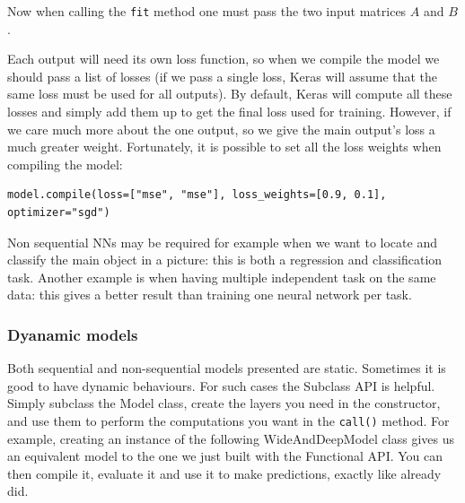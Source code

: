 Now when calling the \lstinline+fit+ method one must pass the two input matrices $A$ and $B$.

Each output will need its own loss function, so when we compile the model we should pass a list of losses (if we pass a single loss, Keras will assume that the same loss must be used for all outputs). By default, Keras will compute all these losses and simply add them up to get the final loss used for training. However, if we care much more about the one output, so we give the main output's loss a much greater weight. Fortunately, it is possible to set all the loss weights when compiling the model:
\begin{lstlisting}
model.compile(loss=["mse", "mse"], loss_weights=[0.9, 0.1], optimizer="sgd")
\end{lstlisting}
				
Non sequential NNs may be required for example when we want to locate and classify the main object in a picture: this is both a regression and classification task. Another example is when having multiple independent task on the same data: this gives a better result than training one neural network per task.

\subsubsection{Dyanamic models}
Both sequential and non-sequential models presented are static. Sometimes it is good to have dynamic behaviours. For such cases the Subclass API is helpful. Simply subclass the Model class, create the layers you need in the constructor, and use them to perform the computations you want in the \lstinline+call()+ method. For example, creating an instance of the following WideAndDeepModel class gives us an equivalent model to the one we just built with the Functional API. You can then compile it, evaluate it and use it to make predictions, exactly like already did.

